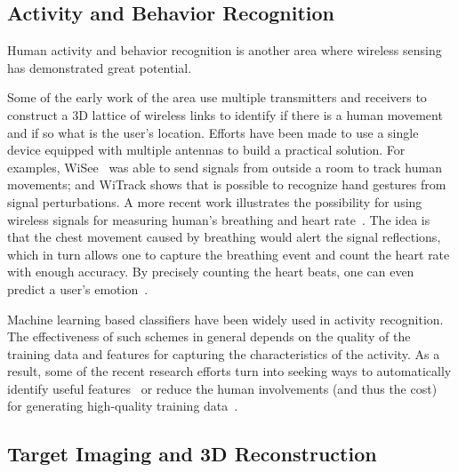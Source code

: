 \subsection{Activity and Behavior Recognition}
Human activity and behavior recognition is another area where wireless sensing has demonstrated great potential.

Some of the early work of the area use multiple transmitters and receivers to construct a 3D lattice of wireless links to identify if there
is a human movement and if so what is the user's location. Efforts have been made to use a single device equipped with multiple antennas to
build a practical solution. For examples, WiSee~\cite{WiSee} was able to send signals from outside a room to track human movements; and WiTrack
shows that is possible to recognize hand gestures from signal perturbations. A more recent work illustrates the possibility for using
wireless signals for measuring human's breathing and heart rate~\cite{Smart-homes}. The idea is that the chest movement caused by
breathing would alert the signal reflections, which in turn allows one to capture the breathing event and count the heart rate with enough
accuracy. By precisely counting the heart beats, one can even predict a user's emotion~\cite{Zhao2017Emotion}.

Machine learning based classifiers have been widely used in activity recognition. The effectiveness of such schemes in general depends on
the quality of the training data and features for capturing the characteristics of the activity. As a result, some of the recent research
efforts turn into seeking ways to automatically identify useful features~\cite{CrossSense} or reduce the human involvements (and thus the
 cost) for generating high-quality training data~\cite{zhao2018rf}.





\subsection{Target Imaging and 3D Reconstruction}

